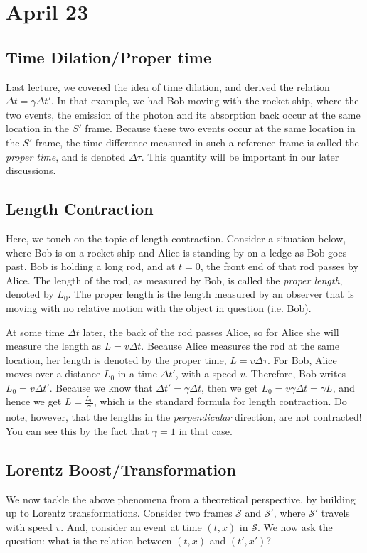 \section{April 23}
\subsection{Time Dilation/Proper time}
Last lecture, we covered the idea of time dilation, and derived the relation \( \Delta t = \gamma \Delta t'
\). In that example, we had Bob moving with the rocket ship, where the two events, the emission of the photon
and its absorption back occur at the same location in the \( S' \) frame. Because these two events occur at
the same location in the \( S' \) frame, the time difference measured in such a reference frame is called the
\textit{proper time}, and is denoted \( \Delta \tau \). This quantity will be important in our later
discussions. 

\subsection{Length Contraction}
Here, we touch on the topic of length contraction. Consider a situation below, where Bob is on a rocket ship
and Alice is standing by on a ledge as Bob goes past. Bob is holding a long rod, and at \( t = 0 \), the
front end of that rod passes by Alice. The length of the rod, as measured by Bob, is called the
\textit{proper length}, denoted by \( L_0 \). The proper length is the length measured by an observer that is
moving with no relative motion with the object in question (i.e. Bob). 

At some time \( \Delta t \) later, the back of the rod passes Alice, so for Alice she will measure the length
as \( L = v \Delta t \). Because Alice measures the rod at the same location, her length is denoted by the
proper time, \( L = v \Delta \tau \). For Bob, Alice moves over a distance \( L_0 \) in a time \( \Delta t'
\), with a speed \( v \). Therefore, Bob writes \( L_0 = v \Delta t' \). Because we know that \( \Delta t'
 = \gamma \Delta t\), then we get \( L_0 = v \gamma \Delta t = \gamma L \), and hence we get \( L =
 \frac{L_0}{\gamma} \), which is the standard formula for length contraction. Do note, however, that the
 lengths in the \textit{perpendicular} direction, are not contracted! You can see this by the fact that \(
 \gamma = 1 \) in that case.   

\subsection{Lorentz Boost/Transformation}
We now tackle the above phenomena from a theoretical perspective, by building up to Lorentz transformations.
Consider two frames \( \mathcal{S} \) and \( \mathcal{S}' \), where \( \mathcal{S}' \) travels with speed \(
v\). And, consider an event at time \( (t, x) \) in \( \mathcal{S} \). We now ask the question: what is the
relation between \( (t, x) \) and \( (t', x') \)?   

